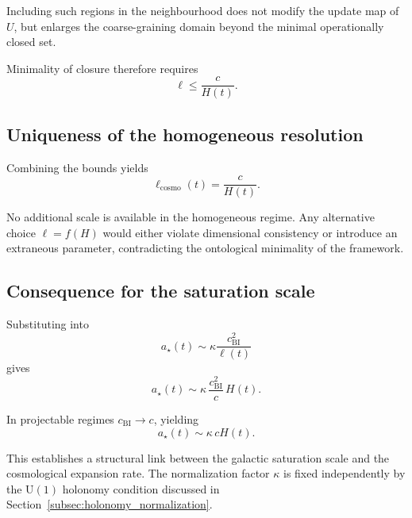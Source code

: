     Including such regions in the neighbourhood does not modify the update
    map of $U$, but enlarges the coarse-graining domain beyond the minimal
    operationally closed set.

    Minimality of closure therefore requires
    \begin{equation}
      \ell \le \frac{c}{H(t)}.
    \end{equation}

  \subsection{Uniqueness of the homogeneous resolution}
    \label{subsec:uniqueness-of-the-homogeneous-resolution}

    Combining the bounds yields
    \begin{equation}
      \ell_{\mathrm{cosmo}}(t) = \frac{c}{H(t)}.
    \end{equation}

    No additional scale is available in the homogeneous regime.
    Any alternative choice $\ell = f(H)$ would either violate dimensional
    consistency or introduce an extraneous parameter, contradicting
    the ontological minimality of the framework.

  \subsection{Consequence for the saturation scale}
    \label{subsec:consequence-for-the-saturation-scale}

    Substituting into
    \begin{equation}
      a_\star(t) \sim \kappa \frac{c_{\mathrm{BI}}^2}{\ell(t)}
    \end{equation}
    gives
    \begin{equation}
      a_\star(t) \sim \kappa\, \frac{c_{\mathrm{BI}}^2}{c}\, H(t).
    \end{equation}

    In projectable regimes $c_{\mathrm{BI}} \to c$, yielding
    \begin{equation}
      a_\star(t) \sim \kappa\, c H(t).
    \end{equation}

    This establishes a structural link between the galactic
    saturation scale and the cosmological expansion rate.
    The normalization factor $\kappa$ is fixed independently by the
    $\mathrm{U}(1)$ holonomy condition discussed in Section~\ref{subsec:holonomy_normalization}.
